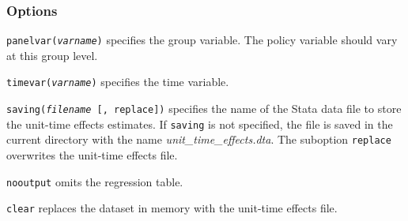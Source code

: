 \documentclass[12pt]{article}
\begin{document}
\subsubsection{Options}
\hangpara
\texttt{panelvar({\it varname})} specifies the group variable.
The policy variable should vary at this group level.

\hangpara
\texttt{timevar({\it varname})} specifies the time variable.

\hangpara
\texttt{saving({\it filename} [, replace])} specifies the name of the Stata data file to store the unit-time effects estimates.
If \texttt{saving} is not specified, the file is saved in the current directory with the name {\it unit\_time\_effects.dta}.
The suboption \texttt{replace} overwrites the unit-time effects file.

\hangpara
\texttt{nooutput} omits the regression table.

\hangpara
\texttt{clear} replaces the dataset in memory with the unit-time effects file.
\end{document}

